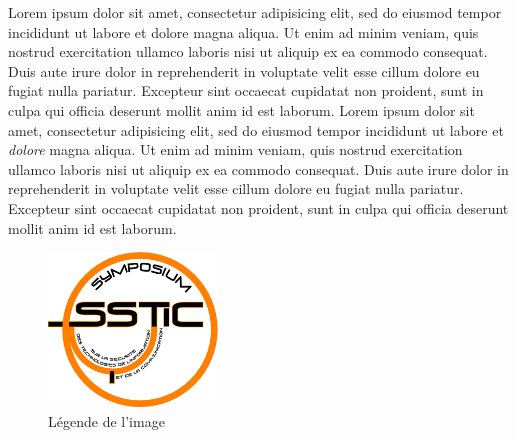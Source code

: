 Lorem ipsum dolor sit amet, consectetur adipisicing elit, sed do
eiusmod tempor incididunt ut labore et dolore magna aliqua. Ut enim ad
minim veniam, quis nostrud exercitation ullamco laboris nisi ut
aliquip ex ea commodo consequat. Duis aute irure dolor in
reprehenderit in voluptate velit esse cillum dolore eu fugiat nulla
pariatur. Excepteur sint occaecat cupidatat non proident, sunt in
culpa qui officia deserunt mollit anim id est laborum. Lorem ipsum
dolor sit amet, consectetur adipisicing elit, sed do eiusmod tempor
incididunt ut labore et \emph{dolore} magna aliqua. Ut enim ad minim
veniam, quis nostrud exercitation ullamco laboris nisi ut aliquip ex
ea commodo consequat. Duis aute irure dolor in reprehenderit in
voluptate velit esse cillum dolore eu fugiat nulla pariatur. Excepteur
sint occaecat cupidatat non proident, sunt in culpa qui officia
deserunt mollit anim id est laborum.


\begin{figure}[ht]
  \centering
  \includegraphics[width=0.4\textwidth]{MonNom/img/archi}
  \caption{Légende de l'image}
  \label{fig:monnom:archi}
\end{figure}

